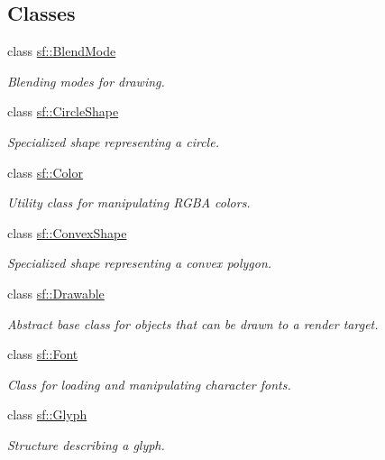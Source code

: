 \subsection*{Classes}
\begin{DoxyCompactItemize}
\item 
class \hyperlink{structsf_1_1_blend_mode}{sf\-::\-Blend\-Mode}
\begin{DoxyCompactList}\small\item\em Blending modes for drawing. \end{DoxyCompactList}\item 
class \hyperlink{classsf_1_1_circle_shape}{sf\-::\-Circle\-Shape}
\begin{DoxyCompactList}\small\item\em Specialized shape representing a circle. \end{DoxyCompactList}\item 
class \hyperlink{classsf_1_1_color}{sf\-::\-Color}
\begin{DoxyCompactList}\small\item\em Utility class for manipulating R\-G\-B\-A colors. \end{DoxyCompactList}\item 
class \hyperlink{classsf_1_1_convex_shape}{sf\-::\-Convex\-Shape}
\begin{DoxyCompactList}\small\item\em Specialized shape representing a convex polygon. \end{DoxyCompactList}\item 
class \hyperlink{classsf_1_1_drawable}{sf\-::\-Drawable}
\begin{DoxyCompactList}\small\item\em Abstract base class for objects that can be drawn to a render target. \end{DoxyCompactList}\item 
class \hyperlink{classsf_1_1_font}{sf\-::\-Font}
\begin{DoxyCompactList}\small\item\em Class for loading and manipulating character fonts. \end{DoxyCompactList}\item 
class \hyperlink{classsf_1_1_glyph}{sf\-::\-Glyph}
\begin{DoxyCompactList}\small\item\em Structure describing a glyph. \end{DoxyCompactList}\item 

\end{DoxyCompactItemize}
